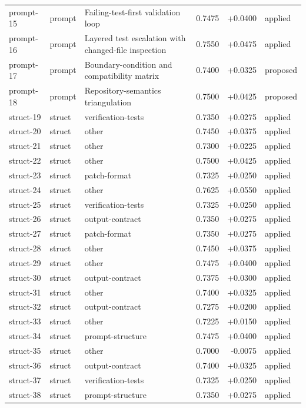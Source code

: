 \begin{center}
\begin{longtable}{llp{5.2cm}rrl}
prompt-15 & prompt & Failing-test-first validation loop & 0.7475 & +0.0400 & applied \\
prompt-16 & prompt & Layered test escalation with changed-file inspection & 0.7550 & +0.0475 & applied \\
prompt-17 & prompt & Boundary-condition and compatibility matrix & 0.7400 & +0.0325 & proposed \\
prompt-18 & prompt & Repository-semantics triangulation & 0.7500 & +0.0425 & proposed \\
struct-19 & struct & verification-tests & 0.7350 & +0.0275 & applied \\
struct-20 & struct & other & 0.7450 & +0.0375 & applied \\
struct-21 & struct & other & 0.7300 & +0.0225 & applied \\
struct-22 & struct & other & 0.7500 & +0.0425 & applied \\
struct-23 & struct & patch-format & 0.7325 & +0.0250 & applied \\
struct-24 & struct & other & 0.7625 & +0.0550 & applied \\
struct-25 & struct & verification-tests & 0.7325 & +0.0250 & applied \\
struct-26 & struct & output-contract & 0.7350 & +0.0275 & applied \\
struct-27 & struct & patch-format & 0.7350 & +0.0275 & applied \\
struct-28 & struct & other & 0.7450 & +0.0375 & applied \\
struct-29 & struct & other & 0.7475 & +0.0400 & applied \\
struct-30 & struct & output-contract & 0.7375 & +0.0300 & applied \\
struct-31 & struct & other & 0.7400 & +0.0325 & applied \\
struct-32 & struct & output-contract & 0.7275 & +0.0200 & applied \\
struct-33 & struct & other & 0.7225 & +0.0150 & applied \\
struct-34 & struct & prompt-structure & 0.7475 & +0.0400 & applied \\
struct-35 & struct & other & 0.7000 & -0.0075 & applied \\
struct-36 & struct & output-contract & 0.7400 & +0.0325 & applied \\
struct-37 & struct & verification-tests & 0.7325 & +0.0250 & applied \\
struct-38 & struct & prompt-structure & 0.7350 & +0.0275 & applied \\

\end{longtable}
\end{center}
